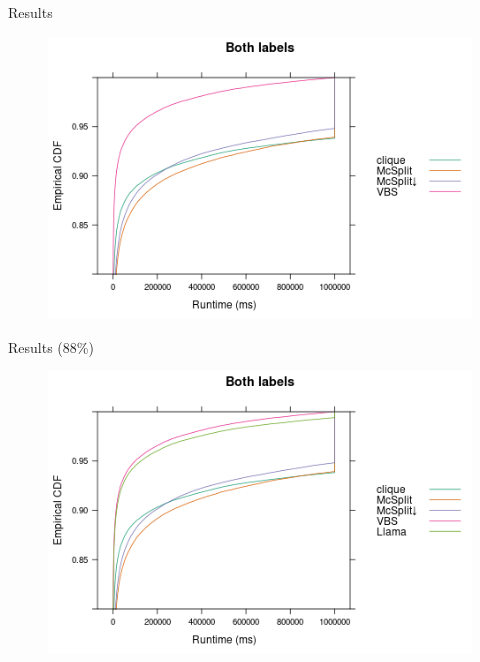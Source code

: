 \documentclass{beamer}
\begin{document}
\begin{frame}{Results}
  \begin{figure}
    \centering
    \includegraphics[width=\textwidth]{../dissertation/images/ecdf_both_labels.png}
  \end{figure}
\end{frame}

\begin{frame}{Results (88\%)}
  \begin{figure}
    \centering
    \includegraphics[width=\textwidth]{../dissertation/images/ecdf_both_labels_llama.png}
  \end{figure}
\end{frame}

\end{document}
